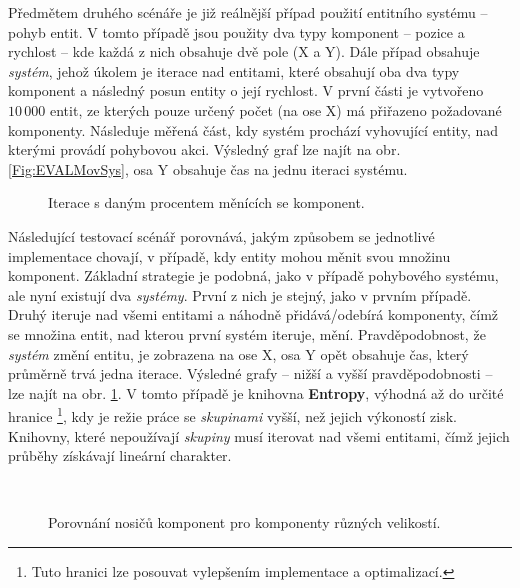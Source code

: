 Předmětem druhého scénáře je již reálnější případ použití entitního systému -- pohyb entit. V tomto případě jsou použity dva typy komponent -- pozice a rychlost -- kde každá z nich obsahuje dvě pole (X a Y). Dále případ obsahuje \emph{systém}, jehož úkolem je iterace nad entitami, které obsahují oba dva typy komponent a následný posun entity o její rychlost. V první části je vytvořeno $10\,000$ entit, ze kterých pouze určený počet (na ose X) má přiřazeno požadované komponenty. Následuje měřená část, kdy systém prochází vyhovující entity, nad kterými provádí pohybovou akci. Výsledný graf lze najít na obr. \ref{Fig:EVALMovSys}, osa Y obsahuje čas na jednu iteraci systému.

\begin{figure}[H]
	\begin{center}
	\end{center}
	\caption{Iterace s daným procentem měnících se komponent.}
	\label{Fig:EVALAdvMovSys}
\end{figure}

Následující testovací scénář porovnává, jakým způsobem se jednotlivé implementace chovají, v případě, kdy entity mohou měnit svou množinu komponent. Základní strategie je podobná, jako v případě pohybového systému, ale nyní existují dva \emph{systémy}. První z nich je stejný, jako v prvním případě. Druhý iteruje nad všemi entitami a náhodně přidává/odebírá komponenty, čímž se množina entit, nad kterou první systém iteruje, mění. Pravděpodobnost, že \emph{systém} změní entitu, je zobrazena na ose X, osa Y opět obsahuje čas, který průměrně trvá jedna iterace. Výsledné grafy -- nižší a  vyšší pravděpodobnosti -- lze najít na obr. \ref{Fig:EVALAdvMovSys}. V tomto případě je knihovna \textbf{Entropy}, výhodná až do určité hranice \footnote{Tuto hranici lze posouvat vylepšením implementace a optimalizací.}, kdy je režie práce se \emph{skupinami} vyšší, než jejich výkoností zisk. Knihovny, které nepoužívají \emph{skupiny} musí iterovat nad všemi entitami, čímž jejich průběhy získávají lineární charakter.

\begin{figure}[H]
	\begin{center}
		 \\
	\end{center}
	\caption{Porovnání nosičů komponent pro komponenty různých velikostí.}
	\label{Fig:EVALHolders}
\end{figure}

